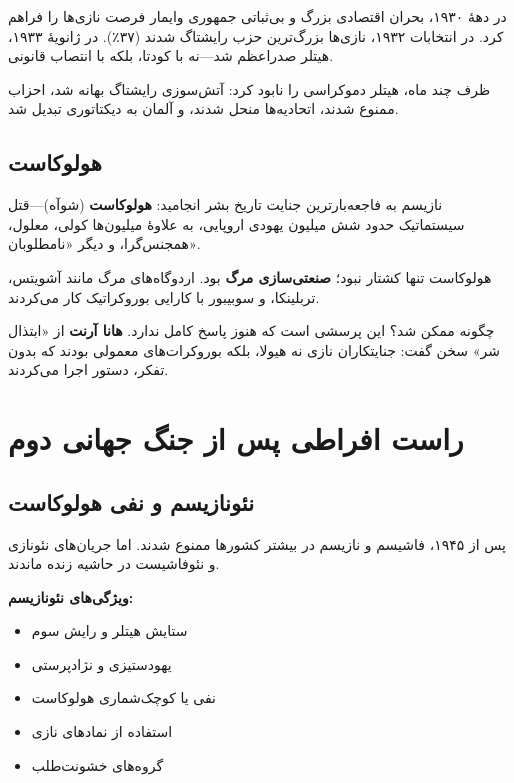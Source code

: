 در دههٔ ۱۹۳۰، بحران اقتصادی بزرگ و بی‌ثباتی جمهوری وایمار فرصت نازی‌ها را فراهم کرد. در انتخابات ۱۹۳۲، نازی‌ها بزرگ‌ترین حزب رایشتاگ شدند (۳۷٪). در ژانویهٔ ۱۹۳۳، هیتلر صدراعظم شد—نه با کودتا، بلکه با انتصاب قانونی.

ظرف چند ماه، هیتلر دموکراسی را نابود کرد: آتش‌سوزی رایشتاگ بهانه شد، احزاب ممنوع شدند، اتحادیه‌ها منحل شدند، و آلمان به دیکتاتوری تبدیل شد.


\subsection{هولوکاست}


نازیسم به فاجعه‌بارترین جنایت تاریخ بشر انجامید: \textbf{هولوکاست} (شوآه)—قتل سیستماتیک حدود شش میلیون یهودی اروپایی، به علاوهٔ میلیون‌ها کولی، معلول، همجنس‌گرا، و دیگر «نامطلوبان».

هولوکاست تنها کشتار نبود؛ \textbf{صنعتی‌سازی مرگ} بود. اردوگاه‌های مرگ مانند آشویتس، تربلینکا، و سوبیبور با کارایی بوروکراتیک کار می‌کردند.

چگونه ممکن شد؟ این پرسشی است که هنوز پاسخ کامل ندارد. \textbf{هانا آرنت} از «ابتذال شر» سخن گفت: جنایتکاران نازی نه هیولا، بلکه بوروکرات‌های معمولی بودند که بدون تفکر، دستور اجرا می‌کردند.


\section{راست افراطی پس از جنگ جهانی دوم}

\subsection{نئونازیسم و نفی هولوکاست}


پس از ۱۹۴۵، فاشیسم و نازیسم در بیشتر کشورها ممنوع شدند. اما جریان‌های نئونازی و نئوفاشیست در حاشیه زنده ماندند.

\textbf{ویژگی‌های نئونازیسم:}
\begin{itemize}
    \item ستایش هیتلر و رایش سوم
    \item یهودستیزی و نژادپرستی
    \item نفی یا کوچک‌شماری هولوکاست
    \item استفاده از نمادهای نازی
    \item گروه‌های خشونت‌طلب
\end{itemize}

